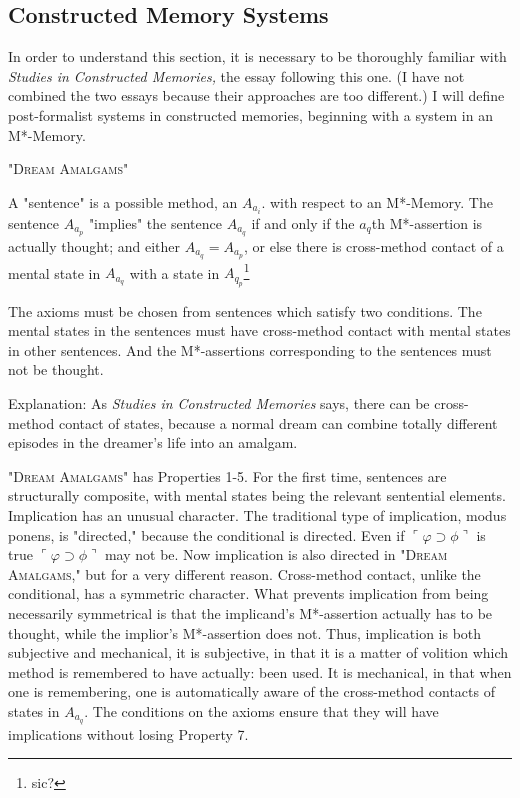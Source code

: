 \documentclass[10pt,twoside]{memoir}
\newcommand{\essaytitle}[1]{
	\emph{#1}}
\begin{document}
\begin{enumerate}
{\begin{enumerate}
\begin{sysrules}
\begin{sysrules}
\begin{sysrules}
\subsection{Constructed Memory Systems}

In order to understand this section, it is necessary to be thoroughly 
familiar with \essaytitle{Studies in Constructed Memories,} the essay following this 
one. (I have not combined the two essays because their approaches are too 
different.) I will define post-formalist systems in constructed memories, 
beginning with a system in an M*-Memory. 

{ \centering \large "\textsc{Dream Amalgams}" \par}

\begin{sysrules}
A "sentence" is a possible method, an $A_{a_i}$. with respect to an M*-Memory. 
The sentence $A_{a_p}$ "implies" the sentence $A_{a_q}$ if and only if the $a_q$th 
M*-assertion is actually thought; and either $A_{a_q} = A_{a_p}$, or else there is 
cross-method contact of a mental state in $A_{a_q}$ with a state in $A_{q_p}$\footnote{sic?}

The axioms must be chosen from sentences which satisfy two conditions. 
The mental states in the sentences must have cross-method contact 
with mental states in other sentences. And the M*-assertions 
corresponding to the sentences must not be thought. 

Explanation: As \essaytitle{Studies in Constructed Memories} says, there can be 
cross-method contact of states, because a normal dream can 
combine totally different episodes in the dreamer's life into an 
amalgam. 
\end{sysrules}

"\textsc{Dream Amalgams}" has Properties 1-5. For the first time, sentences are 
structurally composite, with mental states being the relevant sentential 
elements. Implication has an unusual character. The traditional type of 
implication, modus ponens, is "directed," because the conditional is 
directed. Even if $\ulcorner\varphi\supset\phi\urcorner$ is true 
$\ulcorner\varphi\supset\phi\urcorner$ may not be. Now implication is also 
directed in "\textsc{Dream Amalgams,}" but for a very different reason. 
Cross-method contact, unlike the conditional, has a symmetric character. 
What prevents implication from being necessarily symmetrical is that the 
implicand's M*-assertion actually has to be thought, while the implior's 
M*-assertion does not. Thus, implication is both subjective and mechanical, 
it is subjective, in that it is a matter of volition which method is remembered 
to have actually: been used. It is mechanical, in that when one is 
remembering, one is automatically aware of the cross-method contacts of 
states in $A_{a_q}$. The conditions on the axioms ensure that they will have 
implications without losing Property 7. 


\end{sysrules}
\end{sysrules}
\end{sysrules}
\end{enumerate}}
\end{enumerate}
\end{document}
